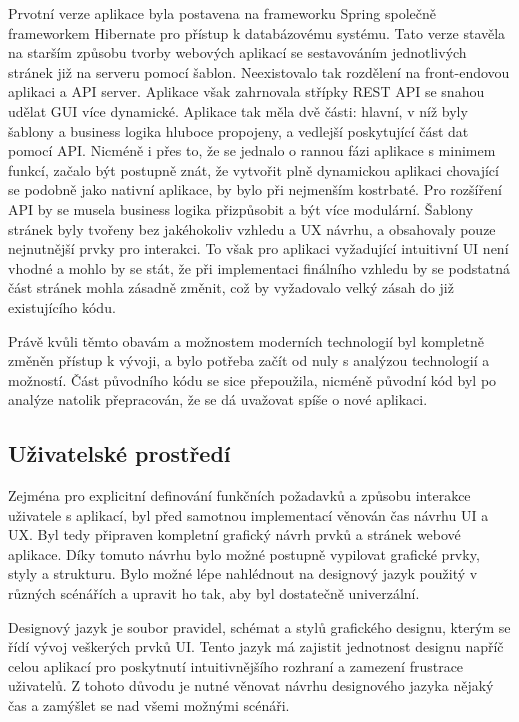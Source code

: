 	Prvotní verze aplikace byla postavena na frameworku Spring společně  frameworkem Hibernate pro
	přístup k databázovému systému.
	Tato verze stavěla na starším způsobu tvorby webových aplikací se sestavováním jednotlivých stránek již na serveru pomocí
	šablon.
	Neexistovalo tak rozdělení na front-endovou aplikaci a \ac{API} server.
	Aplikace však zahrnovala střípky \ac{REST} \ac{API} se snahou udělat \ac{GUI} více dynamické.
	Aplikace tak měla dvě části: hlavní, v níž byly šablony a business logika hluboce propojeny, a vedlejší
	poskytující část dat pomocí \ac{API}.
	Nicméně i přes to, že se jednalo o rannou fázi aplikace s minimem funkcí, začalo být postupně znát, že vytvořit
	plně dynamickou aplikaci chovající se podobně jako nativní aplikace, by bylo při nejmenším kostrbaté.
	Pro rozšíření \ac{API} by se musela business logika přizpůsobit a být více modulární.
	Šablony stránek byly tvořeny bez jakéhokoliv vzhledu a \ac{UX} návrhu, a obsahovaly pouze nejnutnější prvky pro
	interakci.
	To však pro aplikaci vyžadující intuitivní \ac{UI} není vhodné a mohlo by se stát, že při implementaci finálního vzhledu
	by se podstatná část stránek mohla zásadně změnit, což by vyžadovalo velký zásah do již
	existujícího kódu.

	Právě kvůli těmto obavám a možnostem moderních technologií byl kompletně změněn přístup k vývoji, a bylo potřeba začít
	od nuly s analýzou technologií a možností.
	Část původního kódu se sice přepoužila, nicméně původní kód byl po analýze natolik přepracován, že se dá uvažovat
	spíše o nové aplikaci.

	\subsection{Uživatelské prostředí}

 	Zejména pro explicitní definování funkčních požadavků a způsobu interakce uživatele s aplikací, byl před samotnou
	implementací věnován čas návrhu \ac{UI} a \ac{UX}.
	Byl tedy připraven kompletní grafický návrh prvků a stránek webové aplikace.
	Díky tomuto návrhu bylo možné postupně vypilovat grafické prvky, styly a strukturu.
	Bylo možné lépe nahlédnout na designový jazyk použitý v různých scénářích a upravit ho tak, aby byl
	dostatečně univerzální.

	Designový jazyk je soubor pravidel, schémat a stylů grafického designu, kterým se řídí vývoj veškerých prvků \ac{UI}.
	Tento jazyk má zajistit jednotnost designu napříč celou aplikací pro poskytnutí intuitivnějšího rozhraní a zamezení
	frustrace uživatelů.
	Z tohoto důvodu je nutné věnovat návrhu designového jazyka nějaký čas a zamýšlet se nad všemi možnými scénáři.

